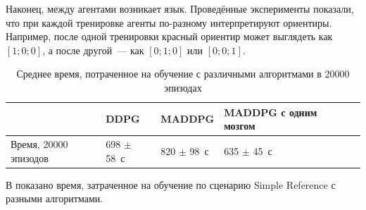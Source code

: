 Наконец, между агентами возникает язык. Проведённые эксперименты показали, что при каждой тренировке агенты по-разному интерпретируют ориентиры. Например, после одной тренировки красный ориентир может выглядеть как ${[1; 0; 0]}$, а после другой~--- как ${[0; 1; 0]}$ или ${[0; 0; 1]}$.

\begin{table}[t!]
    \centering\small
    \caption{Среднее время, потраченное на обучение с различными алгоритмами в 20000 эпизодах}
    \label{tab-sr-time}
    \begin{tabular}{|l|l|l|l|l|l|}
        \hline
        & DDPG           & MADDPG          & MADDPG с одним мозгом \\
        \hline
        Время, 20000 эпизодов & 698 $\pm$ 58~с & 820 $\pm$ 98~с & 635 $\pm$ 45~с       \\ \hline
    \end{tabular}
    \normalsize%
\end{table}

В  показано время, затраченное на обучение по сценарию Simple Reference с разными алгоритмами.
